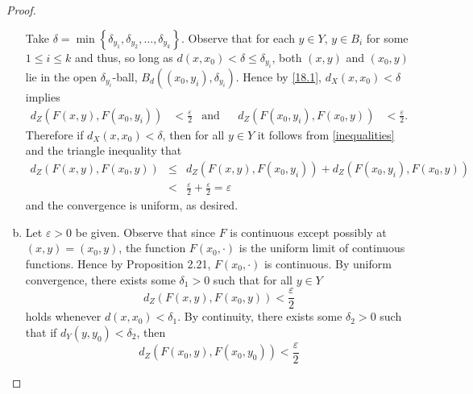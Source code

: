 \documentclass[12pt]{amsart}
\begin{document}
\begin{setup}
\begin{proof}
\begin{enumerate}[(a)]
      Take $\delta = \min \left\{\delta_{y_1}, \delta_{y_2}, \ldots, \delta_{y_k}\right\}$.
      Observe that for each $y \in Y$,  $y \in B_i$ for some $1 \leq i \leq k$ and thus, so long as $d(x, x_0) < \delta \leq \delta_{y_i}$, both $(x, y)$ and $(x_0, y)$ lie in the open $\delta_{y_i}$-ball, $B_d\left(\left(x_0, y_i\right), \delta_{y_i}\right)$.
      Hence by \eqref{18.1}, $d_X(x,x_0) < \delta$ implies
      \begin{align*}\label{inequalities}\tag{$\ast$}
        d_Z\left(F\left(x, y\right), F\left(x_0, y_i\right)\right) &< \frac{\varepsilon}{2} & \text{and}&& d_Z\left(F\left(x_0, y_i\right), F\left(x_0, y\right)\right) &< \frac{\varepsilon}{2}.
      \end{align*}
      Therefore if $d_X(x,x_0) < \delta$, then for all $y \in Y$ it follows from \eqref{inequalities} and the triangle inequality that
      \begin{eqnarray*}
        d_Z(F(x, y), F(x_0, y)) &\leq& d_Z\left(F\left(x, y\right), F\left(x_0, y_i\right)\right) + d_Z\left(F\left(x_0, y_i\right), F\left(x_0, y\right)\right)\\
        &<& \frac{\varepsilon}{2} + \frac{\varepsilon}{2} = \varepsilon
      \end{eqnarray*}
      and the convergence is uniform, as desired.
    \item
      Let $\varepsilon > 0$ be given.
      Observe that since $F$ is continuous except possibly at $(x,y) = (x_0, y)$, the function $F(x_0, \cdot)$ is the uniform limit of continuous functions.
      Hence by Proposition 2.21, $F(x_0, \cdot)$ is continuous.
      By uniform convergence, there exists some $\delta_1 > 0$ such that for all $y \in Y$
      \begin{equation}\label{18.2}
        d_Z\left(F\left(x,y\right), F\left(x_0, y\right)\right) < \frac{\varepsilon}{2}
      \end{equation}
      holds whenever $d(x, x_0) < \delta_1$.
      By continuity, there exists some $\delta_2 > 0$ such that if $d_Y(y,y_0) < \delta_2$, then
      \begin{equation}\label{18.3}
        d_Z\left(F\left(x_0,y\right), F\left(x_0, y_0\right)\right) < \frac{\varepsilon}{2}
      \end{equation}


\end{enumerate}
\end{proof}
\end{setup}
\end{document}
